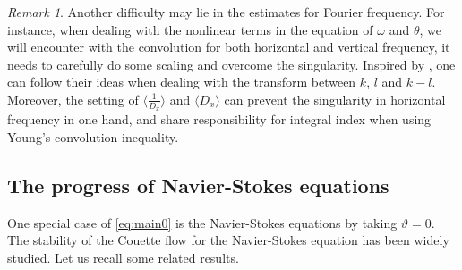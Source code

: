 \documentclass[reqno, 12pt]{amsart} %
\theoremstyle{plain} %
\theoremstyle{definition}
\theoremstyle{remark}
\newtheorem{Rem}[Thm]{Remark}
\numberwithin{equation}{section} %
\begin{document}
	
	\begin{Rem}
	Another difficulty  may lie in the estimates for Fourier frequency. For instance, when dealing with the nonlinear terms in the equation of $\omega$ and $\theta$, we will encounter with the convolution for both horizontal and vertical frequency, it needs to  carefully  do some scaling and overcome the singularity. Inspired by \cite{LLZ2025}, one can follow their ideas when dealing with the transform between $k$, $l$ and $k-l$. Moreover, the setting of $\langle \frac{1}{D_x}\rangle$ and $\langle D_x\rangle$ can prevent the singularity in horizontal frequency in one hand, and share responsibility for integral index when using Young's convolution inequality. 

 \end{Rem}










    
    
    
	









    
	
	
	\subsection{The progress of Navier-Stokes equations}
	One special case of \eqref{eq:main0} is the  Navier-Stokes equations by taking $\vartheta=0$. The stability of the Couette flow for the Navier-Stokes equation has been widely studied. Let us recall some related results. 
	
\end{document}
